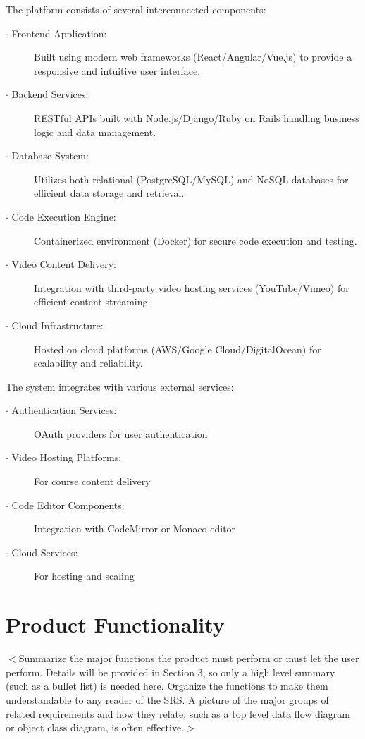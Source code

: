 \documentclass[a4paper, 11pt]{scrreprt}
\begin{document}
The platform consists of several interconnected components:

\begin{description}
    \item[$\cdot$ Frontend Application:] Built using modern web frameworks (React/Angular/Vue.js) to provide a responsive and intuitive user interface.
    \item[$\cdot$ Backend Services:] RESTful APIs built with Node.js/Django/Ruby on Rails handling business logic and data management.
    \item[$\cdot$ Database System:] Utilizes both relational (PostgreSQL/MySQL) and NoSQL databases for efficient data storage and retrieval.
    \item[$\cdot$ Code Execution Engine:] Containerized environment (Docker) for secure code execution and testing.
    \item[$\cdot$ Video Content Delivery:] Integration with third-party video hosting services (YouTube/Vimeo) for efficient content streaming.
    \item[$\cdot$ Cloud Infrastructure:] Hosted on cloud platforms (AWS/Google Cloud/DigitalOcean) for scalability and reliability.
\end{description}

The system integrates with various external services:
\begin{description}
    \item[$\cdot$ Authentication Services:] OAuth providers for user authentication
    \item[$\cdot$ Video Hosting Platforms:] For course content delivery
    \item[$\cdot$ Code Editor Components:] Integration with CodeMirror or Monaco editor
    \item[$\cdot$ Cloud Services:] For hosting and scaling
\end{description}

\section{Product Functionality}
$<$Summarize the major functions the product must perform or must let the user 
perform. Details will be provided in Section 3, so only a high level summary 
(such as a bullet list) is needed here. Organize the functions to make them 
understandable to any reader of the SRS. A picture of the major groups of 
related requirements and how they relate, such as a top level data flow diagram 
or object class diagram, is often effective.$>$
\end{document}
